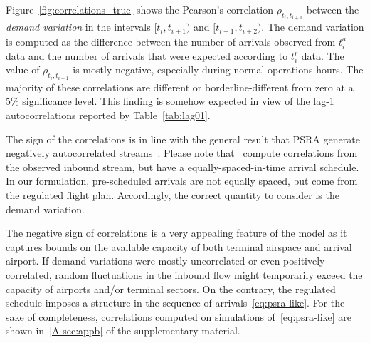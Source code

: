 \documentclass[draft,review]{elsarticle}
\begin{document}
Figure~\ref{fig:correlations_true} shows the Pearson's correlation \(\rho_{t_i, t_{i+1}}\) between the \emph{demand variation} in the intervals \([t_i, t_{i+1})\) and \([t_{i+1}, t_{i+2})\).
The demand variation is computed as the difference between the number of arrivals observed from \(t^{a}_i\) data and the number of arrivals that were expected according to \(t^{r}_i\) data.
The value of \(\rho_{t_i, t_{i+1}}\) is mostly negative, especially during normal operations hours.
The majority of these correlations are different or borderline-different from zero at a 5\% significance level.
This finding is somehow expected in view of the lag-1 autocorrelations reported by Table~\ref{tab:lag01}.
\begin{kpt}
	The sign of the correlations is in line with the general result that \ac{PSRA} generate negatively autocorrelated streams~\citep{guadagni2011queueing}.
  Please note that~\citet{guadagni2011queueing} compute correlations from the observed inbound stream, but have a equally-spaced-in-time arrival schedule.  In our formulation, pre-scheduled arrivals are not equally spaced, but come from the regulated flight plan.
  Accordingly, the correct quantity to consider is the demand variation.
\end{kpt}


  The negative sign of correlations is a very appealing feature of the model as it captures bounds on the available capacity of both terminal airspace and arrival airport.
  If demand variations were mostly uncorrelated or even positively correlated, random fluctuations in the inbound flow might temporarily exceed the capacity of airports and/or terminal sectors.
  On the contrary, the regulated schedule imposes a structure in the sequence of arrivals~\eqref{eq:psra-like}.
For the sake of completeness, correlations computed on simulations of~\ref{eq:psra-like} are shown in~\ref{A-sec:appb} of the supplementary material.
\end{document}
